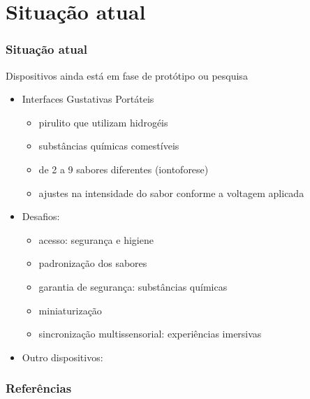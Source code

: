 \documentclass{beamer}
\begin{document}
\section{Situação atual}
\begin{frame}
  \frametitle{Situação atual}
  Dispositivos ainda está em fase de protótipo ou pesquisa \\
  \begin{itemize}
    \item Interfaces Gustativas Portáteis
    \begin{itemize}
      \item pirulito que utilizam hidrogéis
      \item substâncias químicas comestíveis
      \item de 2 a 9 sabores diferentes (iontoforese)
      \item ajustes na intensidade do sabor conforme a voltagem aplicada
    \end{itemize}
    \item Desafios:
    \begin{itemize}
      \item acesso: segurança e higiene
      \item padronização dos sabores
      \item garantia de segurança: substâncias químicas
      \item miniaturização
      \item sincronização multissensorial: experiências imersivas
    \end{itemize}
    \item Outro dispositivos: \cite{reisTrabalho4Interfaces2025}
  \end{itemize}
\end{frame}



\begin{frame}
  \frametitle{Referências}
  \begingroup
  \footnotesize
    
    
  \endgroup
\end{frame}
\end{document}
